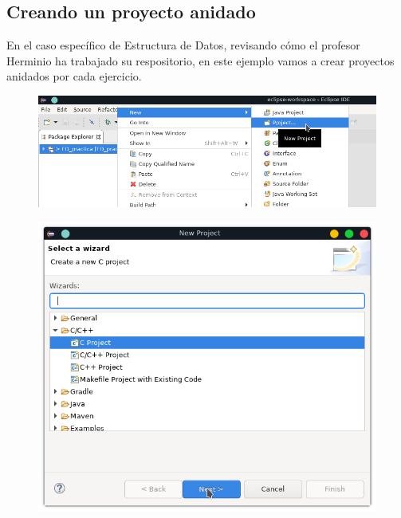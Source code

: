 \documentclass{article}
\begin{document}
\newpage


\subsection*{Creando un proyecto anidado}%
En el caso específico de Estructura de Datos, revisando cómo el profesor
Herminio ha trabajado su respositorio, en este ejemplo vamos a crear proyectos
anidados por cada ejercicio.

\begin{figure}[h!]
  \centering
  \includegraphics[scale=0.75]{./Pictures/020_new_project.png}
\end{figure}

\begin{figure}[h!]
  \centering
  \includegraphics[scale=0.75]{./Pictures/021_c_project.png}
\end{figure}

\newpage
\end{document}
